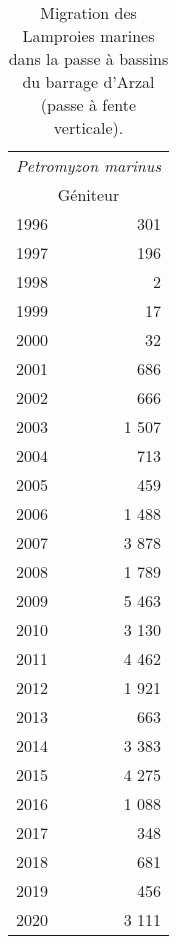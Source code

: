 \begin{table}[ht]
\centering
\begin{tabular}{lr}
  \toprule
  \multicolumn{2}{c}{\textit{Petromyzon marinus}}  \\
\multicolumn{2}{c}{Géniteur} \\
\midrule
1996 & 301 \\ 
  1997 & 196 \\ 
  1998 & 2 \\ 
  1999 & 17 \\ 
  2000 & 32 \\ 
  2001 & 686 \\ 
  2002 & 666 \\ 
  2003 & 1 507 \\ 
  2004 & 713 \\ 
  2005 & 459 \\ 
  2006 & 1 488 \\ 
  2007 & 3 878 \\ 
  2008 & 1 789 \\ 
  2009 & 5 463 \\ 
  2010 & 3 130 \\ 
  2011 & 4 462 \\ 
  2012 & 1 921 \\ 
  2013 & 663 \\ 
  2014 & 3 383 \\ 
  2015 & 4 275 \\ 
  2016 & 1 088 \\ 
  2017 & 348 \\ 
  2018 & 681 \\ 
  2019 & 456 \\ 
  2020 & 3 111 \\ 
   \bottomrule
\end{tabular}
\caption{Migration des Lamproies marines dans la passe à bassins du barrage
				d'Arzal (passe à fente verticale).} 
\label{table_bilanannuel_lpm}
\end{table}

